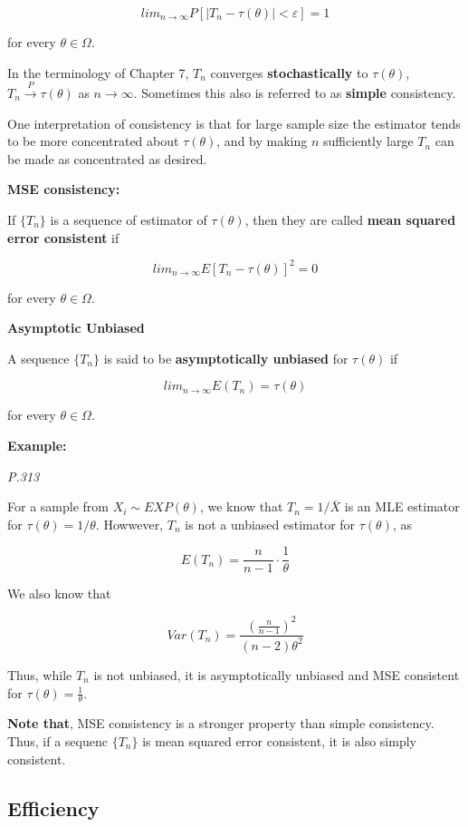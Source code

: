 \documentclass[]{book}
\begin{document}
\[lim_{n\rightarrow \infty}P[|T_n-\tau(\theta)|<\varepsilon]=1\]

for every \(\theta \in \Omega\).

In the terminology of Chapter 7, \(T_n\) converges \textbf{stochastically} to \(\tau(\theta)\), \(T_n \xrightarrow{P} \tau(\theta)\) as \(n \rightarrow \infty\). Sometimes this also is referred to as \textbf{simple} consistency.

One interpretation of consistency is that for large sample size the estimator tends to be more concentrated about \(\tau(\theta)\), and by making \(n\) sufficiently large \(T_n\) can be made as concentrated as desired.

\textbf{MSE consistency:}

If \(\{ T_n \}\) is a sequence of estimator of \(\tau(\theta)\), then they are called \textbf{mean squared error consistent} if

\[lim_{n\rightarrow \infty} E[T_n - \tau(\theta)]^2=0\]

for every \(\theta \in \Omega\).

\textbf{Asymptotic Unbiased}

A sequence \(\{ T_n \}\) is said to be \textbf{asymptotically unbiased} for \(\tau(\theta)\) if

\[lim_{n\rightarrow \infty} E(T_n)=\tau(\theta)\]

for every \(\theta \in \Omega\).

\textbf{Example:}

\emph{P.313}

For a sample from \(X_i \sim EXP(\theta)\), we know that \(T_n=1/ \bar{X}\) is an MLE estimator for \(\tau(\theta)=1/\theta\). Howwever, \(T_n\) is not a unbiased estimator for \(\tau(\theta)\), as

\[E(T_n)=\frac{n}{n-1}\cdot \frac{1}{\theta}\]

We also know that

\[Var(T_n)=\frac{(\frac{n}{n-1})^2}{(n-2)\theta^2}\]

Thus, while \(T_n\) is not unbiased, it is asymptotically unbiased and MSE consistent for \(\tau(\theta)=\frac{1}{\theta}\).

\textbf{Note that}, MSE consistency is a stronger property than simple consistency. Thus, if a sequenc \(\{T_n\}\) is mean squared error consistent, it is also simply consistent.

\hypertarget{efficiency}{%
\subsection{Efficiency}\label{efficiency}}
\end{document}
